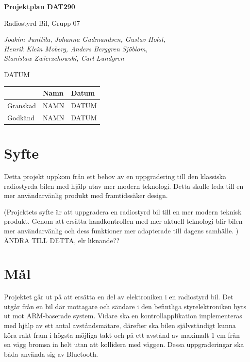 \documentclass[a4paper]{article}
\begin{document}
\begin{titlepage}
\centering
{\bfseries\huge Projektplan DAT290}

\vspace{10mm}

{\Large Radiostyrd Bil, Grupp 07}

\vspace{20mm}

{\Large \itshape{Joakim Junttila, Johanna Gudmandsen, Gustav Holst,\\Henrik Klein Moberg, Anders Berggren Sjöblom, \\[1mm] Stanislaw Zwierzchowski, Carl Lundgren}}

\vspace{10mm}

{DATUM}


\normalsize{
\begin{table}[b]
\centering
\begin{tabular}{|l|l|l|}  \hline
          & \bf Namn & \bf Datum   \\ \hline \hline
 Granskad & NAMN     & DATUM        \\ \hline
 Godkänd  & NAMN     & DATUM         \\ \hline
  \end{tabular}  
  \end{table}}

\end{titlepage}
\newpage
\tableofcontents
\newpage


\section{Syfte}
Detta projekt uppkom från ett behov av en uppgradering till den klassiska radiostyrda bilen med hjälp utav mer modern teknologi. Detta skulle leda till en mer användarvänlig produkt med framtidssäker design.

\vspace{5mm}
(Projektets syfte är att uppgradera en radiostyrd bil till en mer modern teknisk produkt. Genom att ersätta handkontrollen med mer aktuell teknologi blir bilen mer användarvänlig och dess funktioner mer adapterade till dagens samhälle. ) ÄNDRA TILL DETTA, elr liknande??

\section{Mål}
Projektet går ut på att ersätta en del av elektroniken i en radiostyrd bil. Det utgår från en bil där mottagare och sändare i den befintliga styrelektroniken byts ut mot ARM-baserade system. Vidare ska en kontrollapplikation implementeras med hjälp av ett antal avståndsmätare, därefter ska bilen självständigt kunna köra rakt fram i högsta möjliga takt och på ett avstånd av maximalt 1 cm från en vägg bromsa in helt utan att kollidera med väggen. Dessa uppgraderingar ska båda använda sig av Bluetooth. 
\end{document}
